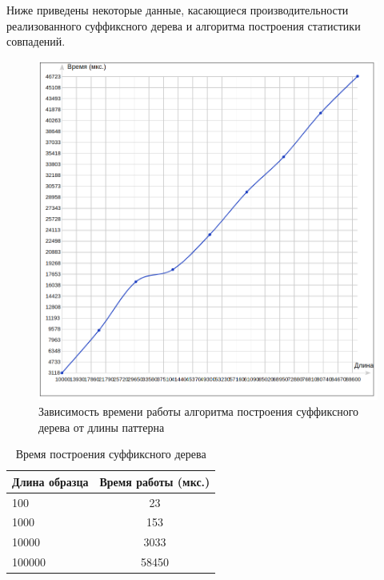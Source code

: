 \documentclass[12pt]{article}
\begin{document}
Ниже приведены некоторые данные, касающиеся производительности реализованного суффиксного дерева и алгоритма построения статистики совпадений.

\begin{figure}[H]
  \caption{Зависимость времени работы алгоритма построения суффиксного дерева от длины паттерна}
  \centering
       \includegraphics[width=\linewidth]{st.png}
\end{figure}

\begin{table}[h]
\caption{Время построения суффиксного дерева}
\label{tabular:timesandtenses}
\begin{center}
\begin{tabular}{|l|c|}
\hline
\textbf{Длина образца} & \textbf{Время работы (мкс.)} \\
\hline
100 & 23 \\
\hline
1000 & 153 \\
\hline
10000 & 3033 \\
\hline
100000 & 58450 \\
\hline
\end{tabular}
\end{center}
\end{table}

\end{document}
